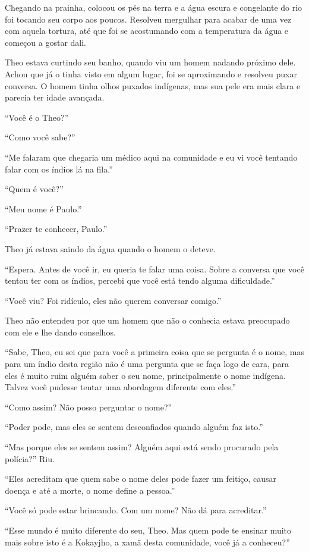 Chegando na prainha, colocou os pés na terra e a água escura e
congelante do rio foi tocando seu corpo aos poucos. Resolveu mergulhar
para acabar de uma vez com aquela tortura, até que foi se acostumando
com a temperatura da água e começou a gostar dali.

Theo estava curtindo seu banho, quando viu um homem nadando próximo
dele. Achou que já o tinha visto em algum lugar, foi se aproximando e
resolveu puxar conversa. O homem tinha olhos puxados indígenas, mas sua
pele era mais clara e parecia ter idade avançada.

``Você é o Theo?''

``Como você sabe?''

``Me falaram que chegaria um médico aqui na comunidade e eu vi você
tentando falar com os índios lá na fila.''

``Quem é você?''

``Meu nome é Paulo.''

``Prazer te conhecer, Paulo.''

Theo já estava saindo da água quando o homem o deteve.

``Espera. Antes de você ir, eu queria te falar uma coisa. Sobre a
conversa que você tentou ter com os índios, percebi que você está tendo
alguma dificuldade.''

``Você viu? Foi ridículo, eles não querem conversar comigo.''

Theo não entendeu por que um homem que não o conhecia estava preocupado
com ele e lhe dando conselhos.

``Sabe, Theo, eu sei que para você a primeira coisa que se pergunta é o
nome, mas para um índio desta região não é uma pergunta que se faça logo
de cara, para eles é muito ruim alguém saber o seu nome, principalmente
o nome indígena. Talvez você pudesse tentar uma abordagem diferente com
eles.''

``Como assim? Não posso perguntar o nome?''

``Poder pode, mas eles se sentem desconfiados quando alguém faz isto.''

``Mas porque eles se sentem assim? Alguém aqui está sendo procurado pela
polícia?'' Riu.

``Eles acreditam que quem sabe o nome deles pode fazer um feitiço,
causar doença e até a morte, o nome define a pessoa.''

``Você só pode estar brincando. Com um nome? Não dá para acreditar.''

``Esse mundo é muito diferente do seu, Theo. Mas quem pode te ensinar
muito mais sobre isto é a Kokayjho, a xamã desta comunidade, você já a
conheceu?''

